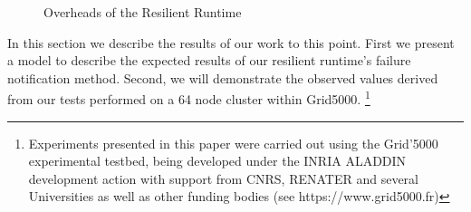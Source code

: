 \begin{figure}[t]
  \centering
  \caption{Overheads of the Resilient Runtime}
  \label{fig:overheads}
\end{figure}

In this section we describe the results of our work to this point. First we present a model
to describe the expected results of our resilient runtime's failure notification
method. Second, we will demonstrate the observed values derived from our tests
performed on a 64 node cluster within Grid5000. \footnote{Experiments presented
in this paper were carried out using the Grid'5000 experimental testbed, being
developed under the INRIA ALADDIN development action with support from CNRS,
RENATER and several Universities as well as other funding bodies (see
https://www.grid5000.fr)}


